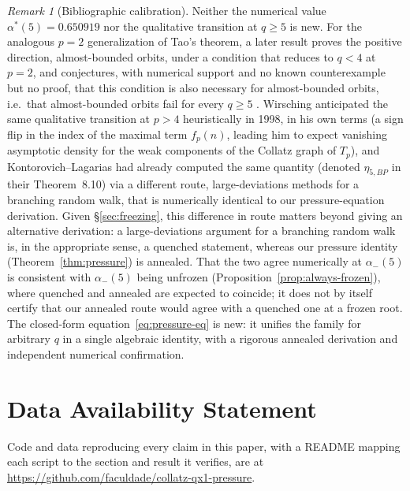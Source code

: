 \documentclass[11pt]{article}
\theoremstyle{remark}
\newtheorem{remark}[theorem]{Remark}
\begin{document}
\begin{remark}[Bibliographic calibration]\label{rem:novelty-109}
Neither the numerical value $\alpha^\ast(5)=0.650919$ nor the
qualitative transition at $q\ge5$ is new. For the analogous $p=2$
generalization of Tao's theorem, a later result proves the positive
direction, almost-bounded orbits, under a condition that reduces to
$q<4$ at $p=2$, and conjectures, with numerical support and no known
counterexample but no proof, that this condition is also necessary
for almost-bounded orbits, i.e.\ that almost-bounded orbits fail for
every $q\ge5$
\cite[Theorem~1.3; the necessity claim is discussed, not itself
numbered, in the paragraph following Conjecture~1.5]{GoncalvesGreenfeldMadrid2022}.
Wirsching
\cite[Ch.~III, \S5, following Theorem~5.2]{Wirsching1998} anticipated
the same qualitative transition at $p>4$ heuristically in 1998, in his
own terms (a sign flip in the index of the maximal term $f_p(n)$,
leading him to expect vanishing asymptotic density for the weak
components of the Collatz graph of $T_p$),
and Kontorovich--Lagarias \cite{KontorovichLagarias2010} had already
computed the same quantity
(denoted $\eta_{5,BP}$ in their Theorem~8.10) via a different route,
large-deviations methods for a branching random walk, that is
numerically identical to our pressure-equation derivation. Given
\S\ref{sec:freezing}, this difference in route matters beyond giving
an alternative derivation: a large-deviations argument for a
branching random walk is, in the appropriate sense, a quenched
statement, whereas our pressure identity (Theorem~\ref{thm:pressure})
is annealed. That the two agree numerically at $\alpha_-(5)$ is
consistent with $\alpha_-(5)$ being unfrozen
(Proposition~\ref{prop:always-frozen}), where quenched and annealed
are expected to coincide; it does not by itself certify that our
annealed route would agree with a quenched one at a frozen root. The
closed-form equation~\eqref{eq:pressure-eq} is new: it unifies the
family for arbitrary $q$ in a single algebraic
identity, with a rigorous annealed derivation and
independent numerical confirmation.
\end{remark}

\section*{Data Availability Statement}

Code and data reproducing every claim in this paper, with a README
mapping each script to the section and result it verifies, are at
\url{https://github.com/faculdade/collatz-qx1-pressure}.
\end{document}
